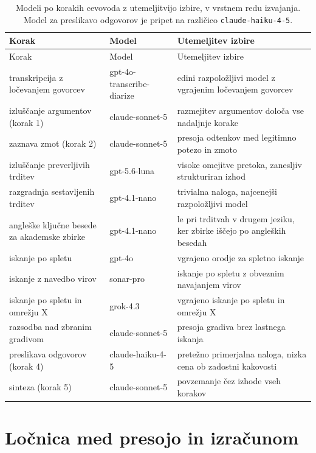 \documentclass[a4paper, 12pt]{book}
\begin{document}
\begingroup
\small
{}
\begin{longtable}{@{}p{}p{}p{}@{}}
\caption{Modeli po korakih cevovoda z utemeljitvijo izbire, v vrstnem redu
izvajanja. Model za preslikavo odgovorov je pripet na različico
\texttt{claude-haiku-4-5}.}
\label{tbl:modeli}\\
\toprule
Korak & Model & Utemeljitev izbire \\
\midrule
\endfirsthead
\toprule
Korak & Model & Utemeljitev izbire \\
\midrule
\endhead
\bottomrule
\endfoot
transkripcija z ločevanjem govorcev & gpt-4o-transcribe-diarize & edini razpoložljivi model z vgrajenim ločevanjem govorcev \\
izluščanje argumentov (korak 1) & claude-sonnet-5 & razmejitev argumentov določa vse nadaljnje korake \\
zaznava zmot (korak 2) & claude-sonnet-5 & presoja odtenkov med legitimno potezo in zmoto \\
izluščanje preverljivih trditev & gpt-5.6-luna & visoke omejitve pretoka, zanesljiv strukturiran izhod \\
razgradnja sestavljenih trditev & gpt-4.1-nano & trivialna naloga, najcenejši razpoložljivi model \\
angleške ključne besede za akademske zbirke & gpt-4.1-nano & le pri trditvah v drugem jeziku, ker zbirke iščejo po angleških besedah \\
iskanje po spletu & gpt-4o & vgrajeno orodje za spletno iskanje \\
iskanje z navedbo virov & sonar-pro & iskanje po spletu z obveznim navajanjem virov \\
iskanje po spletu in omrežju X & grok-4.3 & vgrajeno iskanje po spletu in omrežju X \\
razsodba nad zbranim gradivom & claude-sonnet-5 & presoja gradiva brez lastnega iskanja \\
preslikava odgovorov (korak 4) & claude-haiku-4-5 & pretežno primerjalna naloga, nizka cena ob zadostni kakovosti \\
sinteza (korak 5) & claude-sonnet-5 & povzemanje čez izhode vseh korakov \\
\end{longtable}
\endgroup

\chapter{Ločnica med presojo in izračunom}
\label{app:locnica}
\end{document}
